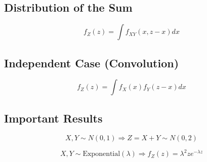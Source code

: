 \documentclass[11pt]{article}
\begin{document}
\subsection{Distribution of the Sum}

\[
f_Z(z) =
\int f_{XY}(x,z-x)dx
\]

\subsection{Independent Case (Convolution)}

\[
f_Z(z) =
\int f_X(x)f_Y(z-x)dx
\]

\subsection{Important Results}

\[
X,Y \sim N(0,1)
\Rightarrow
Z = X+Y \sim N(0,2)
\]

\[
X,Y \sim \text{Exponential}(\lambda)
\Rightarrow
f_Z(z) = \lambda^2 z e^{-\lambda z}
\]
\end{document}
